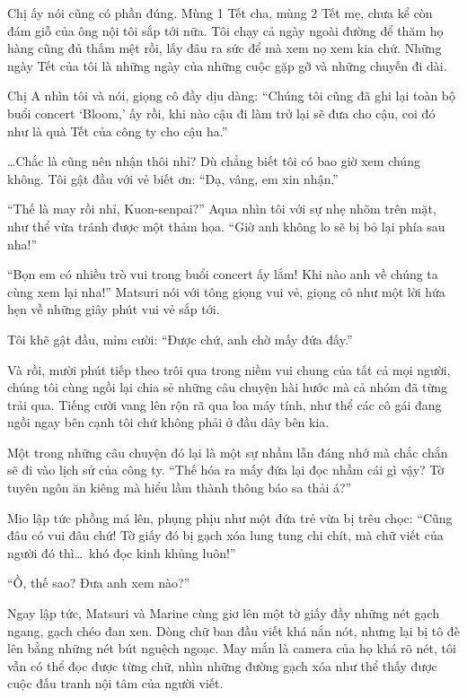 \documentclass[../main.tex]{subfiles}
\begin{document}
Chị ấy nói cũng có phần đúng. Mùng 1 Tết cha, mùng 2 Tết mẹ, chưa kể còn đám giỗ của ông nội tôi sắp tới nữa. Tôi chạy cả ngày ngoài đường để thăm họ hàng cũng đủ thấm mệt rồi, lấy đâu ra sức để mà xem nọ xem kia chứ. Những ngày Tết của tôi là những ngày của những cuộc gặp gỡ và những chuyến đi dài.

Chị A nhìn tôi và nói, giọng cô đầy dịu dàng: ``Chúng tôi cũng đã ghi lại toàn bộ buổi concert `Bloom,' ấy rồi, khi nào cậu đi làm trở lại sẽ đưa cho cậu, coi đó như là quà Tết của công ty cho cậu ha.''

\dots Chắc là cũng nên nhận thôi nhỉ? Dù chẳng biết tôi có bao giờ xem chúng không. Tôi gật đầu với vẻ biết ơn: ``Dạ, vâng, em xin nhận.''

``Thế là may rồi nhỉ, Kuon-senpai?'' Aqua nhìn tôi với sự nhẹ nhõm trên mặt, như thể vừa tránh được một thảm họa. ``Giờ anh không lo sẽ bị bỏ lại phía sau nha!''

``Bọn em có nhiều trò vui trong buổi concert ấy lắm! Khi nào anh về chúng ta cùng xem lại nha!'' Matsuri nói với tông giọng vui vẻ, giọng cô như một lời hứa hẹn về những giây phút vui vẻ sắp tới.

Tôi khẽ gật đầu, mỉm cười: ``Được chứ, anh chờ mấy đứa đấy.''

Và rồi, mười phút tiếp theo trôi qua trong niềm vui chung của tất cả mọi người, chúng tôi cùng ngồi lại chia sẻ những câu chuyện hài hước mà cả nhóm đã từng trải qua. Tiếng cười vang lên rộn rã qua loa máy tính, như thể các cô gái đang ngồi ngay bên cạnh tôi chứ không phải ở đầu dây bên kia.

Một trong những câu chuyện đó lại là một sự nhầm lẫn đáng nhớ mà chắc chắn sẽ đi vào lịch sử của công ty. ``Thế hóa ra mấy đứa lại đọc nhầm cái gì vậy? Tờ tuyên ngôn ăn kiêng mà hiểu lầm thành thông báo sa thải á?''

Mio lập tức phồng má lên, phụng phịu như một đứa trẻ vừa bị trêu chọc: ``Cũng đâu có vui đâu chứ! Tờ giấy đó bị gạch xóa lung tung chi chít, mà chữ viết của người đó thì\dots\ khó đọc kinh khủng luôn!''

``Ồ, thế sao? Đưa anh xem nào?''

Ngay lập tức, Matsuri và Marine cùng giơ lên một tờ giấy đầy những nét gạch ngang, gạch chéo đan xen. Dòng chữ ban đầu viết khá nắn nót, nhưng lại bị tô đè lên bằng những nét bút nguệch ngoạc. May mắn là camera của họ khá rõ nét, tôi vẫn có thể đọc được từng chữ, nhìn những đường gạch xóa như thể thấy được cuộc đấu tranh nội tâm của người viết.
\end{document}
